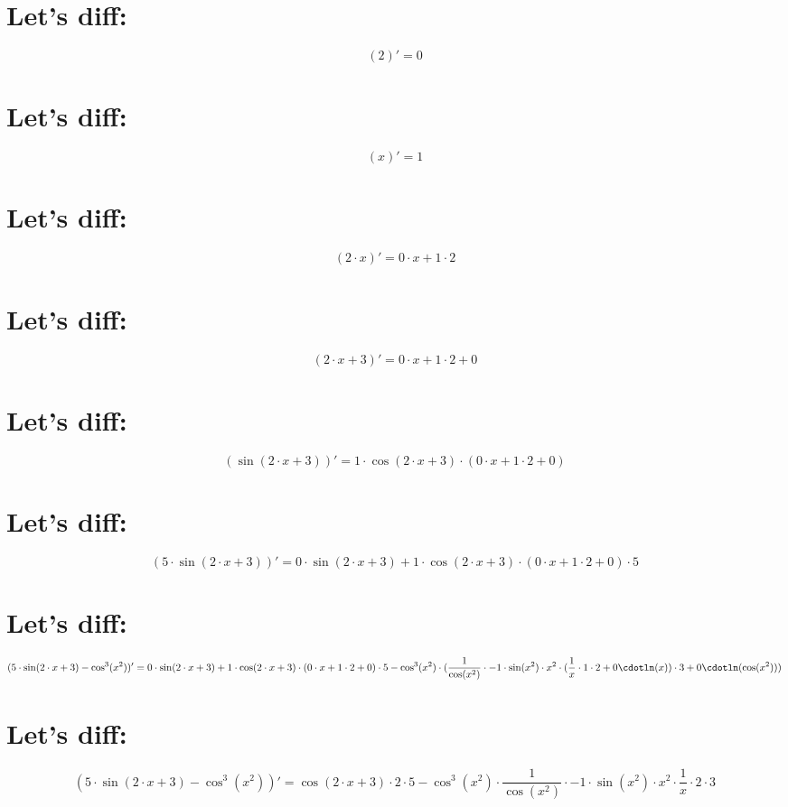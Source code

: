 \documentclass[a4paper,12pt]{article}
\begin{document}
\section{Let's diff:}
\begin{center}
	$$( 2 )' =  0 $$
\end{center}
\section{Let's diff:}
\begin{center}
	$$( x )' =  1 $$
\end{center}
\section{Let's diff:}
\begin{center}
	$$( 2 \cdot x )' =  0 \cdot x + 1 \cdot 2 $$
\end{center}
\section{Let's diff:}
\begin{center}
	$$( 2 \cdot x + 3 )' =  0 \cdot x + 1 \cdot 2 + 0 $$
\end{center}
\section{Let's diff:}
\begin{center}
	$$(\sin( 2 \cdot x + 3 ))' =  1 \cdot\cos( 2 \cdot x + 3 )\cdot( 0 \cdot x + 1 \cdot 2 + 0 )$$
\end{center}
\section{Let's diff:}
\begin{center}
	$$( 5 \cdot\sin( 2 \cdot x + 3 ))' =  0 \cdot\sin( 2 \cdot x + 3 )+ 1 \cdot\cos( 2 \cdot x + 3 )\cdot( 0 \cdot x + 1 \cdot 2 + 0 )\cdot 5 $$
\end{center}
\section{Let's diff:}
\begin{center}
	$$( 5 \cdot\sin( 2 \cdot x + 3 )-\cos^{ 3 }( x ^ 2 ))' =  0 \cdot\sin( 2 \cdot x + 3 )+ 1 \cdot\cos( 2 \cdot x + 3 )\cdot( 0 \cdot x + 1 \cdot 2 + 0 )\cdot 5 -\cos^{ 3 }( x ^ 2 )\cdot(\frac 1 {\cos( x ^ 2 )}\cdot -1 \cdot\sin( x ^ 2 )\cdot x ^ 2 \cdot(\frac 1  x \cdot 1 \cdot 2 + 0 \cdotln( x ))\cdot 3 + 0 \cdotln(\cos( x ^ 2 )))$$
\end{center}
\section{Let's diff:}
\begin{center}
	$$( 5 \cdot\sin( 2 \cdot x + 3 )-\cos^{ 3 }( x ^ 2 ))' = \cos( 2 \cdot x + 3 )\cdot 2 \cdot 5 -\cos^{ 3 }( x ^ 2 )\cdot\frac 1 {\cos( x ^ 2 )}\cdot -1 \cdot\sin( x ^ 2 )\cdot x ^ 2 \cdot\frac 1  x \cdot 2 \cdot 3 $$
\end{center}
\end{document}
